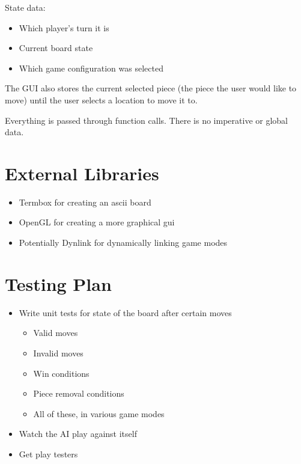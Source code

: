 \documentclass[11pt, oneside]{article}
\begin{document}
\begin{enumerate}
State data:
\begin{itemize}
\item Which player's turn it is
\item Current board state
\item Which game configuration was selected
\end{itemize}
The GUI also stores the current selected piece (the piece the user would like to
move) until the user selects a location to move it to.

Everything is passed through function calls. There is no imperative or global
data.

\section{External Libraries}
\begin{itemize}
\item Termbox for creating an ascii board
\item OpenGL for creating a more graphical gui
\item Potentially Dynlink for dynamically linking game modes
\end{itemize}

\section{Testing Plan}
\begin{itemize}
\item Write unit tests for state of the board after certain moves
  \begin{itemize}
  \item Valid moves
  \item Invalid moves
  \item Win conditions
  \item Piece removal conditions
  \item All of these, in various game modes
  \end{itemize}
\item Watch the AI play against itself
\item Get play testers
\end{itemize}


\end{enumerate}
\end{document}
